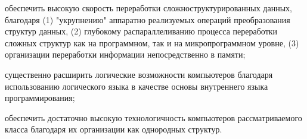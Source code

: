\begin{SCn}
{\begin{scnitemize}
		\item обеспечить высокую скорость переработки сложноструктурированных данных, благодаря (1) "укрупнению" аппаратно реализуемых операций преобразования структур данных, (2) глубокому распараллеливанию процесса переработки сложных структур как на программном, так и на микропрограммном уровне, (3) организации переработки информации непосредственно в памяти;
		\item существенно расширить логические возможности компьютеров благодаря использованию логического языка в качестве основы внутреннего языка программирования;
		\item обеспечить достаточно высокую технологичность компьютеров рассматриваемого класса благодаря их организации как однородных структур.
	\end{scnitemize}
}
\bigskip

\scnendstruct \scnendcurrentsectioncomment

\end{SCn}